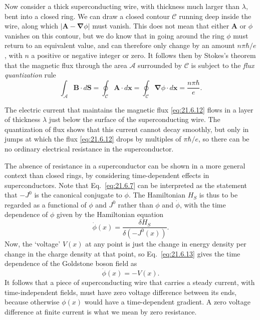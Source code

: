 Now consider a thick superconducting wire, with thickness much larger than $\lambda$, bent into a closed ring. We can draw a closed contour $\mathcal C$ running deep inside the wire, along which $|\mathbf A-\boldsymbol\nabla\phi|$ must vanish. This does not mean that either $\mathbf A$ or $\phi$ vanishes on this contour, but we do know that in going around the ring $\phi$ must return to an equivalent value, and can therefore only change by an amount $n\pi\hbar/e$, with $n$ a positive or negative integer or zero. It follows then by Stokes's theorem that the magnetic flux through the area $\mathcal A$ surrounded by $\mathcal C$ is subject to the \emph{flux quantization} rule
\begin{equation}
\int_{\mathcal A}\mathbf B\cdot d\mathbf S
=\oint_{\mathcal C}\mathbf A\cdot d\mathbf x
=\oint_{\mathcal C}\boldsymbol\nabla\phi\cdot d\mathbf x
=\frac{n\pi\hbar}{e}.
\tag{21.6.12}\label{eq:21.6.12}
\end{equation}

The electric current that maintains the magnetic flux \eqref{eq:21.6.12} flows in a layer of thickness $\lambda$ just below the surface of the superconducting wire. The quantization of flux shows that this current cannot decay smoothly, but only in jumps at which the flux \eqref{eq:21.6.12} drops by multiples of $\pi\hbar/e$, so there can be no ordinary electrical resistance in the superconductor.

The absence of resistance in a superconductor can be shown in a more general context than closed rings, by considering time-dependent effects in superconductors. Note that Eq.~\eqref{eq:21.6.7} can be interpreted as the statement that $-J^0$ is the canonical conjugate to $\phi$. The Hamiltonian $H_S$ is thus to be regarded as a functional of $\phi$ and $J^0$ rather than $\phi$ and $\dot\phi$, with the time dependence of $\phi$ given by the Hamiltonian equation
\begin{equation}
\dot\phi(x)=\frac{\delta H_S}{\delta(-J^0(x))}.
\tag{21.6.13}\label{eq:21.6.13}
\end{equation}
Now, the `voltage' $V(x)$ at any point is just the change in energy density per change in the charge density at that point, so Eq.~\eqref{eq:21.6.13} gives the time dependence of the Goldstone boson field as
\begin{equation}
\dot\phi(x)=-V(x).
\tag{21.6.14}\label{eq:21.6.14}
\end{equation}
It follows that a piece of superconducting wire that carries a steady current, with time-independent fields, must have zero voltage difference between its ends, because otherwise $\phi(x)$ would have a time-dependent gradient. A zero voltage difference at finite current is what we mean by zero resistance.

